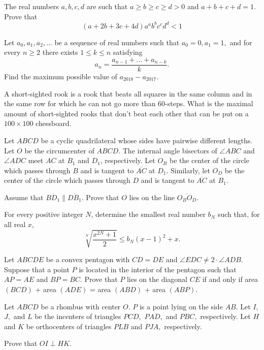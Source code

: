 \documentclass[11pt]{scrartcl}
\begin{document}
\begin{problem}[3813623497653179264]
	The real numbers $a, b, c, d$ are such that $a\geq b\geq c\geq d>0$ and $a+b+c+d=1$. Prove that
\[(a+2b+3c+4d)a^ab^bc^cd^d<1\]
\end{problem}
\begin{problem}[3923745101517032298]
	Let $a_0,a_1,a_2,\dots $ be a sequence of real numbers such that $a_0=0, a_1=1,$ and for every $n\geq 2$ there exists $1 \leq k \leq n$ satisfying\[ a_n=\frac{a_{n-1}+\dots + a_{n-k}}{k}. \]Find the maximum possible value of $a_{2018}-a_{2017}$.
\end{problem}
\begin{problem}[105422576188851]
A short-sighted rook is a rook that beats all squares in the same column and in the same row for which he can not go more than $60$-steps.
What is the maximal amount of short-sighted rooks that don't beat each other that can be put on a $100\times 100$ chessboard.
\end{problem}
\begin{problem}[6025085618534905645]
	Let $ABCD$ be a cyclic quadrilateral whose sides have pairwise different lengths. Let $O$ be the circumcenter of $ABCD$. The internal angle bisectors of $\angle ABC$ and $\angle ADC$ meet $AC$ at $B_1$ and $D_1$, respectively. Let $O_B$ be the center of the circle which passes through $B$ and is tangent to $\overline{AC}$ at $D_1$. Similarly, let $O_D$ be the center of the circle which passes through $D$ and is tangent to $\overline{AC}$ at $B_1$.

Assume that $\overline{BD_1} \parallel \overline{DB_1}$. Prove that $O$ lies on the line $\overline{O_BO_D}$.
\end{problem}
\begin{problem}[7500559455615129254]
For every positive integer $N$, determine the smallest real number $b_{N}$ such that, for all real $x$,
\[
\sqrt[N]{\frac{x^{2 N}+1}{2}} \leqslant b_{N}(x-1)^{2}+x .
\]
\end{problem}
\begin{problem}[1336030836839904136]
Let $ABCDE$ be a convex pentagon with $CD= DE$ and $\angle EDC \ne 2 \cdot \angle ADB$.
Suppose that a point $P$ is located in the interior of the pentagon such that $AP =AE$ and $BP= BC$.
Prove that $P$ lies on the diagonal $CE$ if and only if area $(BCD)$ + area $(ADE)$ = area $(ABD)$ + area $(ABP)$.
\end{problem}
\begin{problem}[857598260795435]
Let $ ABCD $ be a rhombus with center $ O. $ $ P $ is a point lying on the side $ AB. $ Let $ I, $ $ J, $ and $ L $ be the incenters of triangles $ PCD, $ $ PAD, $ and $PBC, $ respectively. Let $ H $ and $ K $ be orthocenters of triangles $ PLB $ and $ PJA, $ respectively.

Prove that $ OI \perp HK. $
\end{problem}
\end{document}
